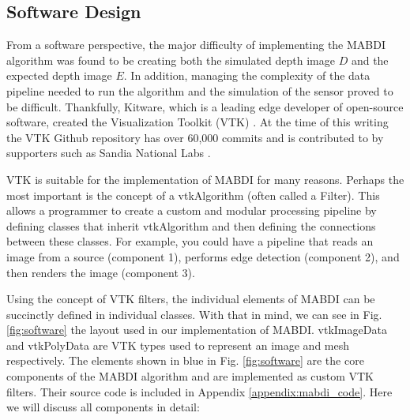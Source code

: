\subsection{Software Design}

From a software perspective, the major difficulty of implementing the MABDI
algorithm was found to be creating both the simulated depth image $D$ and the
expected depth image $E$. In addition, managing the complexity of the data
pipeline needed to run the algorithm and the simulation of the sensor proved to
be difficult. Thankfully, Kitware, which is a leading edge developer of
open-source software, created the Visualization Toolkit (VTK)
\cite{schroeder2004visualization, sitevtk}. At the time of this writing the VTK
Github repository has over 60,000 commits and is contributed to by supporters
such as Sandia National Labs \cite{sitesandia}.

VTK is suitable for the implementation of MABDI for many reasons. Perhaps
the most important is the concept of a vtkAlgorithm (often called a Filter).
This allows a programmer to create a custom and modular processing pipeline by
defining classes that inherit vtkAlgorithm and then defining the connections
between these classes. For example, you could have a pipeline that reads an
image from a source (component 1), performs edge detection (component 2), and
then renders the image (component 3).

Using the concept of VTK filters, the individual elements of MABDI can be
succinctly defined in individual classes. With that in mind, we can see in Fig.
\ref{fig:software} the layout used in our implementation of MABDI. vtkImageData
and vtkPolyData are VTK types used to represent an image and mesh respectively.
The elements shown in blue in Fig. \ref{fig:software} are the core components of
the MABDI algorithm and are implemented as custom VTK filters. Their source code
is included in Appendix \ref{appendix:mabdi_code}. Here we will discuss all
components in detail:

